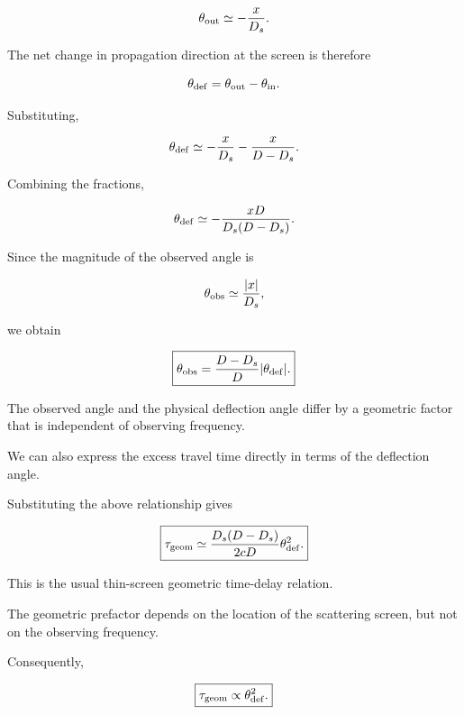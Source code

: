 \begin{equation}
\theta_{\rm out}\simeq
-\frac{x}{D_s}.
\end{equation}

The net change in propagation direction
at the screen is therefore

\begin{equation}
\theta_{\rm def}
=
\theta_{\rm out}-\theta_{\rm in}.
\end{equation}

Substituting,

\begin{equation}
\theta_{\rm def}
\simeq
-\frac{x}{D_s}
-\frac{x}{D-D_s}.
\end{equation}

Combining the fractions,

\begin{equation}
\theta_{\rm def}
\simeq
-\frac{xD}{D_s(D-D_s)}.
\end{equation}

Since the magnitude of the observed angle is

\begin{equation}
\theta_{\rm obs}\simeq\frac{|x|}{D_s},
\end{equation}

we obtain

\begin{equation}
\boxed{
\theta_{\rm obs}
=
\frac{D-D_s}{D}
|\theta_{\rm def}|.
}
\end{equation}

The observed angle and the physical deflection
angle differ by a geometric factor that is
independent of observing frequency.

We can also express the excess travel time
directly in terms of the deflection angle.

Substituting the above relationship gives

\begin{equation}
\boxed{
\tau_{\rm geom}\simeq
\frac{D_s(D-D_s)}{2cD}
\theta_{\rm def}^2.
}
\end{equation}

This is the usual thin-screen geometric
time-delay relation.

The geometric prefactor depends on the
location of the scattering screen, but not
on the observing frequency.

Consequently,

\begin{equation}
\boxed{
\tau_{\rm geom}\propto\theta_{\rm def}^2.
}
\end{equation}


